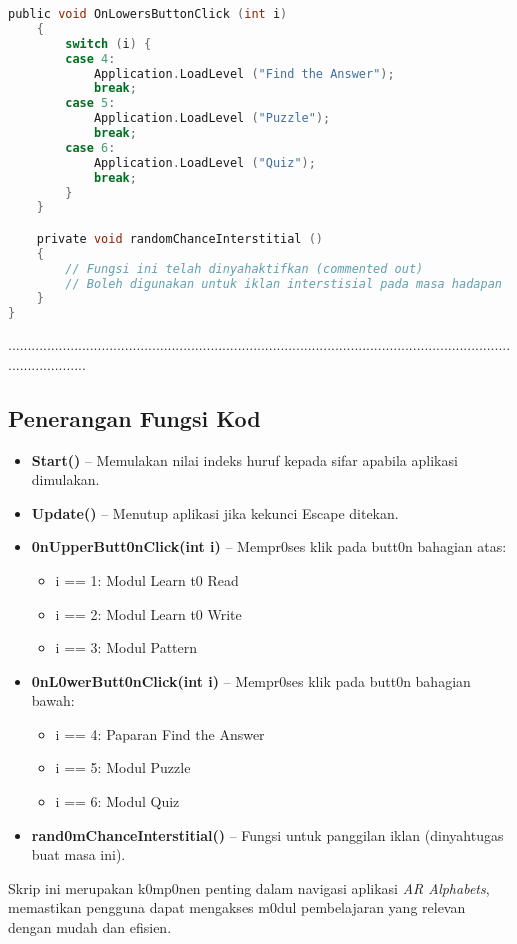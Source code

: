 \begin{itemize}
\begin{itemize}
\begin{itemize}
\begin{itemize}
\begin{itemize}
\begin{itemize}
\begin{itemize}
\begin{itemize}
\begin{flushleft}
\begin{lstlisting}[language=C,caption={K0d Skrip Menu Utama Aplikasi \textit{AR Alphabets}},label={lst:menu-script}]
    public void OnLowersButtonClick (int i)
    {
        switch (i) {
        case 4:
            Application.LoadLevel ("Find the Answer");
            break;
        case 5:
            Application.LoadLevel ("Puzzle");
            break;
        case 6:
            Application.LoadLevel ("Quiz");
            break;
        }
    }

    private void randomChanceInterstitial ()
    {
        // Fungsi ini telah dinyahaktifkan (commented out)
        // Boleh digunakan untuk iklan interstisial pada masa hadapan
    }
}
\end{lstlisting}
.....................................................................................................................................................
\subsection*{Penerangan Fungsi Kod}

\begin{itemize}
  \item \textbf{Start()} -- Memulakan nilai indeks huruf kepada sifar apabila aplikasi dimulakan.
  \item \textbf{Update()} -- Menutup aplikasi jika kekunci Escape ditekan.
  \item \textbf{0nUpperButt0nClick(int i)} -- Mempr0ses klik pada butt0n bahagian atas:
  \begin{itemize}
    \item i == 1: Modul Learn t0 Read
    \item i == 2: Modul Learn t0 Write
    \item i == 3: Modul Pattern
  \end{itemize}
  \item \textbf{0nL0werButt0nClick(int i)} -- Mempr0ses klik pada butt0n bahagian bawah:
  \begin{itemize}
    \item i == 4: Paparan Find the Answer
    \item i == 5: Modul Puzzle
    \item i == 6: Modul Quiz
  \end{itemize}
  \item \textbf{rand0mChanceInterstitial()} -- Fungsi untuk panggilan iklan (dinyahtugas buat masa ini).
\end{itemize}

\bigskip

Skrip ini merupakan k0mp0nen penting dalam navigasi aplikasi \textit{AR Alphabets}, memastikan pengguna dapat mengakses m0dul pembelajaran yang relevan dengan mudah dan efisien.
\clearpage

\end{flushleft}
\end{itemize}
\end{itemize}
\end{itemize}
\end{itemize}
\end{itemize}
\end{itemize}
\end{itemize}
\end{itemize}
